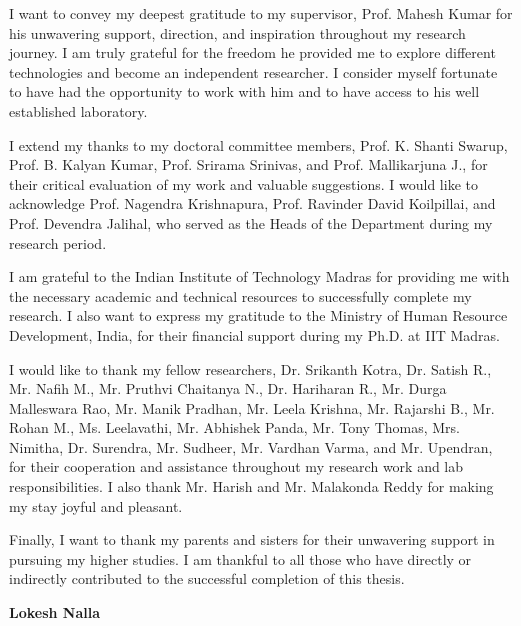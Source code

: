 \acknowledgements
%
I want to convey my deepest gratitude to my supervisor, Prof. Mahesh Kumar for his unwavering support, direction, and inspiration throughout my research journey. I am truly grateful for the freedom he provided me to explore different technologies and become an independent researcher. I consider myself fortunate to have had the opportunity to work with him and to have access to his well established laboratory.  

I extend my thanks to my doctoral committee members, Prof. K. Shanti Swarup, Prof. B. Kalyan Kumar, Prof. Srirama Srinivas, and Prof. Mallikarjuna J., for their critical evaluation of my work and valuable suggestions.
I would like to acknowledge Prof. Nagendra Krishnapura, Prof. Ravinder David Koilpillai, and Prof. Devendra Jalihal, who served as the Heads of the Department during my research period. 

I am grateful to the Indian Institute of Technology Madras for providing me with the necessary academic and technical resources to successfully complete my research. I also want to express my gratitude to the Ministry of Human Resource Development, India, for their financial support during my Ph.D. at IIT Madras.

I would like to thank my fellow researchers, Dr. Srikanth Kotra, Dr. Satish R., Mr. Nafih M., Mr. Pruthvi Chaitanya N., Dr. Hariharan R., Mr. Durga Malleswara Rao, Mr. Manik Pradhan, Mr. Leela Krishna,  Mr. Rajarshi B., Mr. Rohan M., Ms. Leelavathi, Mr. Abhishek Panda, Mr. Tony Thomas, Mrs. Nimitha, Dr. Surendra, Mr. Sudheer, Mr. Vardhan Varma, and Mr. Upendran, for their cooperation and assistance throughout my research work and lab responsibilities. I also thank Mr. Harish and Mr. Malakonda Reddy for making my stay joyful and pleasant.

Finally, I want to thank my parents and sisters for their unwavering support in pursuing my higher studies. I am thankful to all those who have directly or indirectly contributed to the successful completion of this thesis.  

\begin{flushright}
{\textbf{Lokesh Nalla}}
\end{flushright}